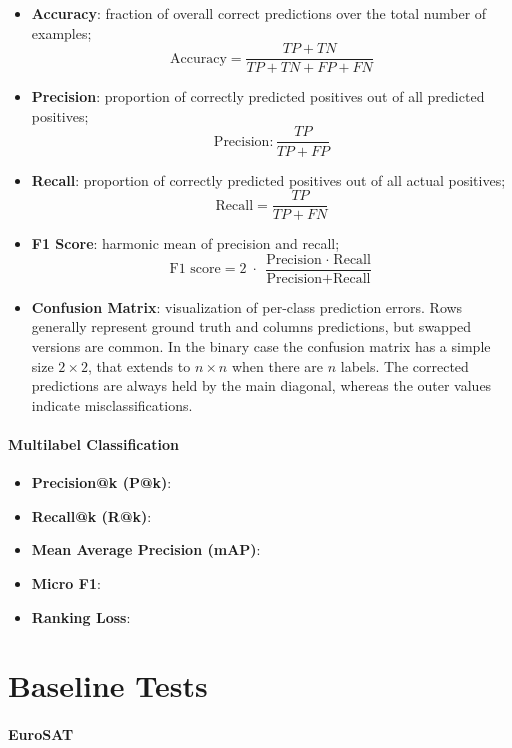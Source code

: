 \documentclass[a4paper, oneside, english]{sapthesis} %
\begin{document}
\begin{itemize}
    \item \textbf{Accuracy}: fraction of overall correct predictions over the total number of examples;
    $$
    \text{Accuracy} = \frac{TP + TN}{TP + TN + FP + FN}
    $$
    \item \textbf{Precision}: proportion of correctly predicted positives out of all predicted positives;
    $$
    \text{Precision}: \frac{TP}{TP + FP}
    $$
    \item \textbf{Recall}: proportion of correctly predicted positives out of all actual positives;
    $$
    \text{Recall} = \frac{TP}{TP + FN}
    $$
    \item \textbf{F1 Score}: harmonic mean of precision and recall;
    $$
    \text{F1 score} = 2 \;\cdot\; \frac{\text{Precision} \;\cdot\; \text{Recall}}{\text{Precision} + \text{Recall}}
    $$
    \item \textbf{Confusion Matrix}: visualization of per-class prediction errors. Rows generally represent ground truth and columns predictions, but swapped versions are common. In the binary case the confusion matrix has a simple size $2\times2$, that extends to $n \times n$ when there are $n$ labels. The corrected predictions are always held by the main diagonal, whereas the outer values indicate misclassifications.
\end{itemize}

\paragraph{Multilabel Classification}

\begin{itemize}
    \item \textbf{Precision@k (P@k)}:
    \item \textbf{Recall@k (R@k)}:
    \item \textbf{Mean Average Precision (mAP)}:
    \item \textbf{Micro F1}:
    \item \textbf{Ranking Loss}:
\end{itemize}


\section{Baseline Tests}

\paragraph{EuroSAT}
\end{document}
